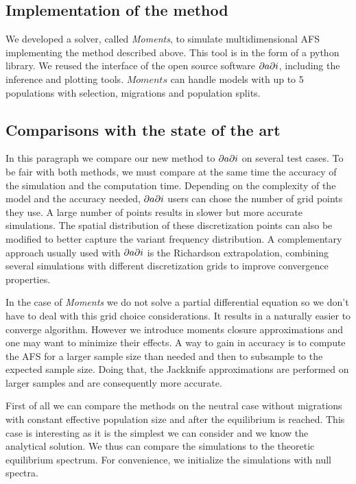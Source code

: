 \subsection{Implementation of the method}
We developed a solver, called \textit{Moments}, to simulate multidimensional AFS implementing the method described above. This tool is in the form of a python library. We reused the interface of the open source software $\partial a \partial i$, including the inference and plotting tools. $Moments$ can handle models with up to 5 populations with selection, migrations and population splits.

\subsection{Comparisons with the state of the art}
In this paragraph we compare our new method to $\partial a \partial i$ on several test cases. To be fair with both methods, we must compare at the same time the accuracy of the simulation and the computation time. Depending on the complexity of the model and the accuracy needed, $\partial a \partial i$ users can chose the number of grid points they use. A large number of points results in slower but more accurate simulations. The spatial distribution of these discretization points can also be modified to better capture the variant frequency distribution. A complementary approach usually used with $\partial a \partial i$ is the Richardson extrapolation, combining several simulations with different discretization grids to improve convergence properties.

In the case of \textit{Moments} we do not solve a partial differential equation so we don't have to deal with this grid choice considerations. It results in a naturally easier to converge algorithm. However we introduce moments closure approximations and one may want to minimize their effects. A way to gain in accuracy is to compute the AFS for a larger sample size than needed and then to subsample to the expected sample size. Doing that, the Jackknife approximations are performed on larger samples and are consequently more accurate.

First of all we can compare the methods on the neutral case without migrations with constant effective population size and after the equilibrium is reached.
This case is interesting as it is the simplest we can consider and we know the analytical solution. We thus can compare the simulations to the theoretic equilibrium spectrum. For convenience, we initialize the simulations with null spectra.

